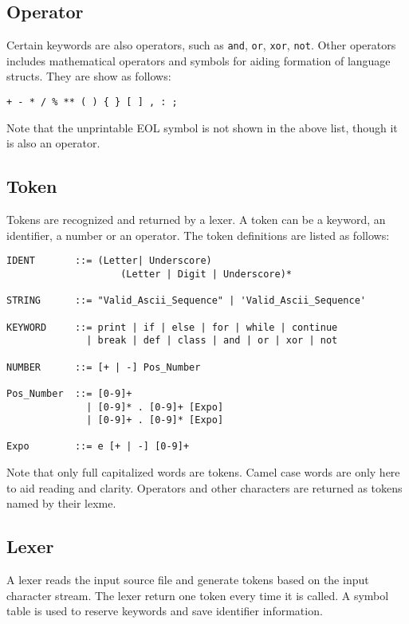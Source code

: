 \documentclass[10pt,a4paper]{article}
\begin{document}
\subsection{Operator}
Certain keywords are also operators, such as \lstinline$and$, 
\lstinline$or$, \lstinline$xor$, \lstinline$not$. Other operators
includes mathematical operators and symbols for aiding formation
of language structs. They are show as follows:
\begin{lstlisting}
+ - * / % ** ( ) { } [ ] , : ;
\end{lstlisting}
Note that the unprintable EOL symbol is not shown in the above list,
though it is also an operator. 

\subsection{Token}
Tokens are recognized and returned by a lexer. A token can be a keyword,
an identifier, a number or an operator. The token definitions are listed
as follows:

\begin{verbatim}
IDENT       ::= (Letter| Underscore) 
                    (Letter | Digit | Underscore)*

STRING      ::= "Valid_Ascii_Sequence" | 'Valid_Ascii_Sequence'

KEYWORD     ::= print | if | else | for | while | continue 
              | break | def | class | and | or | xor | not
              
NUMBER      ::= [+ | -] Pos_Number

Pos_Number  ::= [0-9]+ 
              | [0-9]* . [0-9]+ [Expo] 
              | [0-9]+ . [0-9]* [Expo]

Expo        ::= e [+ | -] [0-9]+
\end{verbatim}

Note that only full capitalized words are tokens. Camel case words
are only here to aid reading and clarity. 
Operators and other characters are returned as tokens named by their lexme.

\subsection{Lexer}
A lexer reads the input source file and generate tokens based on 
the input character stream. The lexer return one token every time
it is called. A symbol table is used to reserve keywords and save
identifier information.

\pagebreak
\end{document}
